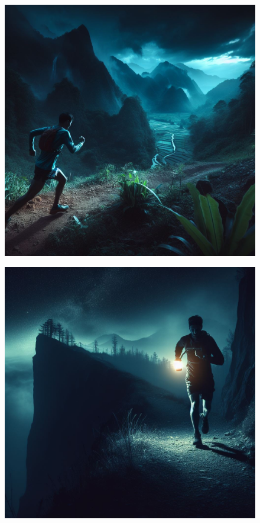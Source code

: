 \documentclass{beamer}
\begin{document}
\begin{frame}
  \begin{figure}
    \includegraphics[scale=0.25]{./lecture_includes/trail_runner}
  \end{figure}
\end{frame}

\begin{frame}
  \begin{figure}
    \includegraphics[scale=0.25]{./lecture_includes/trail_runner_2}
  \end{figure}
\end{frame}
\end{document}
